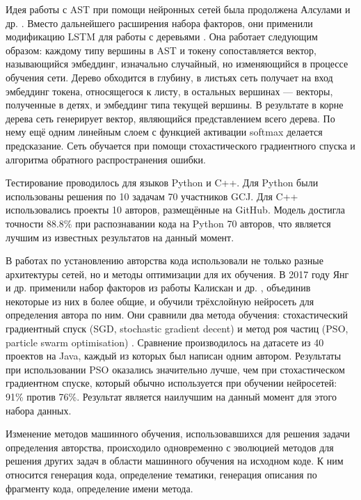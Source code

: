 Идея работы с AST при помощи нейронных сетей была продолжена Алсулами и др. \cite{Alsulami2017}. Вместо дальнейшего расширения набора факторов, они применили модификацию LSTM для работы с деревьями \cite{Tai2015}. Она работает следующим образом: каждому типу вершины в AST и токену сопоставляется вектор, называющийся эмбеддинг, изначально случайный, но изменяющийся в процессе обучения сети. Дерево обходится в глубину, в листьях сеть получает на вход эмбеддинг токена, относящегося к листу, в остальных вершинах — векторы, полученные в детях, и эмбеддинг типа текущей вершины. В результате в корне дерева сеть генерирует вектор, являющийся представлением всего дерева. По нему ещё одним линейным слоем с функцией активации softmax делается предсказание. Сеть обучается при помощи стохастического градиентного спуска и алгоритма обратного распространения ошибки.

Тестирование проводилось для языков Python и C++. Для Python были использованы решения по 10 задачам 70 участников GCJ. Для C++ использовались проекты 10 авторов, размещённые на GitHub. Модель достигла точности 88.8\% при распознавании кода на Python 70 авторов, что является лучшим из известных результатов на данный момент.

В работах по установлению авторства кода использовали не только разные архитектуры сетей, но и методы оптимизации для их обучения. В 2017 году Янг и др. \cite{Yang2017} применили набор факторов из работы Калискан и др. \cite{Caliskan2015}, объединив некоторые из них в более общие, и обучили трёхслойную нейросеть для определения автора по ним. Они сравнили два метода обучения: стохастический градиентный спуск (SGD, stochastic gradient decent) и метод роя частиц (PSO, particle swarm optimisation) \cite{Kennedy1995}. Сравнение производилось на датасете из 40 проектов на Java, каждый из которых был написан одним автором. Результаты при использовании PSO оказались значительно лучше, чем при стохастическом градиентном спуске, который обычно используется при обучении нейросетей: 91\% против 76\%. Результат является наилучшим на данный момент для этого набора данных.

Изменение методов машинного обучения, использовавшихся для решения задачи определения авторства, происходило одновременно с эволюцией методов для решения других задач в области машинного обучения на исходном коде. К ним относится генерация кода, определение тематики, генерация описания по фрагменту кода, определение имени метода.

